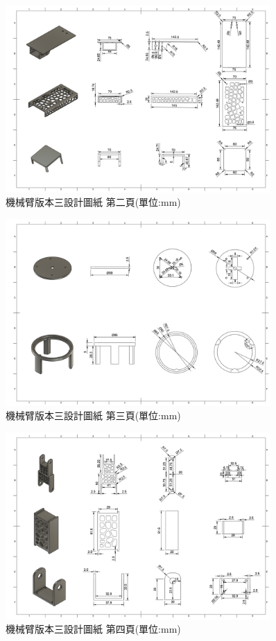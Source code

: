 \documentclass[class=NCU_thesis, crop=false]{standalone}
\begin{document}
\begin{figure}[htbp]
    \centering
    \includegraphics[width=0.9\textwidth]{figures/Armv3 (2).PNG}
    \caption{機械臂版本三設計圖紙 第二頁(單位:mm)}
\end{figure}

\begin{figure}[htbp]
    \centering
    \includegraphics[width=0.9\textwidth]{figures/Armv3 (3).PNG}
    \caption{機械臂版本三設計圖紙 第三頁(單位:mm)}
\end{figure}

\begin{figure}[htbp]
    \centering
    \includegraphics[width=0.9\textwidth]{figures/Armv3 (4).PNG}
    \caption{機械臂版本三設計圖紙 第四頁(單位:mm)}
\end{figure}
\end{document}
